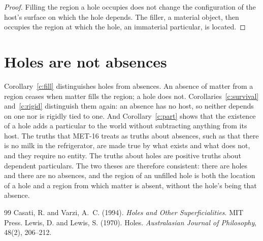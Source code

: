 \documentclass{situationist-preprint}
\begin{document}
\begin{proof}
Filling the region a hole occupies does not change the configuration of the host's surface on which the hole depends. The filler, a material object, then occupies the region at which the hole, an immaterial particular, is located.
\end{proof}

\section{Holes are not absences}

Corollary~\ref{c:fill} distinguishes holes from absences. An absence of matter from a region ceases when matter fills the region; a hole does not. Corollaries~\ref{c:survival} and~\ref{c:rigid} distinguish them again: an absence has no host, so neither depends on one nor is rigidly tied to one. And Corollary~\ref{c:part} shows that the existence of a hole adds a particular to the world without subtracting anything from its host. The truths that MET-16 treats as truths about absences, such as that there is no milk in the refrigerator, are made true by what exists and what does not, and they require no entity. The truths about holes are positive truths about dependent particulars. The two theses are therefore consistent: there are holes and there are no absences, and the region of an unfilled hole is both the location of a hole and a region from which matter is absent, without the hole's being that absence.

\begin{thebibliography}{99}\small
{} Casati, R. and Varzi, A.~C. (1994). \emph{Holes and Other Superficialities}. MIT Press.
 Lewis, D. and Lewis, S. (1970). Holes. \emph{Australasian Journal of Philosophy}, 48(2), 206--212.
\end{thebibliography}
\end{document}
